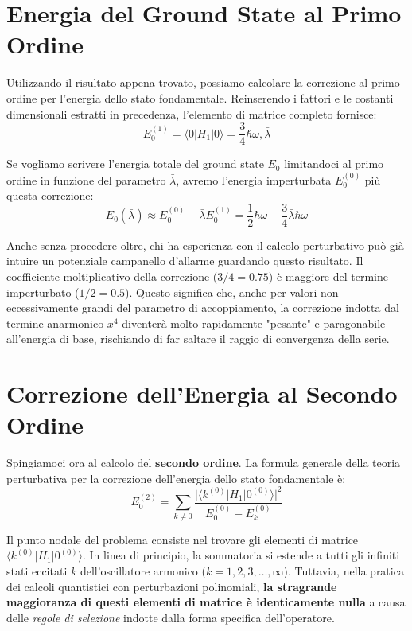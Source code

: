 \section{Energia del Ground State al Primo Ordine}

Utilizzando il risultato appena trovato, possiamo calcolare la correzione al primo ordine per l'energia dello stato fondamentale. Reinserendo i fattori e le costanti dimensionali estratti in precedenza, l'elemento di matrice completo fornisce:
\begin{equation}
E_0^{(1)} = \langle 0 | H_1 | 0 \rangle = \frac{3}{4} \hbar \omega , \bar{\lambda}
\end{equation}

Se vogliamo scrivere l'energia totale del ground state $E_0$ limitandoci al primo ordine in funzione del parametro $\bar{\lambda}$, avremo l'energia imperturbata $E_0^{(0)}$ più questa correzione:
\begin{equation}
E_0(\bar{\lambda}) \approx E_0^{(0)} + \bar{\lambda} E_0^{(1)} = \frac{1}{2} \hbar \omega + \frac{3}{4} \bar{\lambda} \hbar \omega
\end{equation}

Anche senza procedere oltre, chi ha esperienza con il calcolo perturbativo può già intuire un potenziale campanello d'allarme guardando questo risultato. Il coefficiente moltiplicativo della correzione ($3/4 = 0.75$) è maggiore del termine imperturbato ($1/2 = 0.5$). Questo significa che, anche per valori non eccessivamente grandi del parametro di accoppiamento, la correzione indotta dal termine anarmonico $x^4$ diventerà molto rapidamente "pesante" e paragonabile all'energia di base, rischiando di far saltare il raggio di convergenza della serie.

\section{Correzione dell'Energia al Secondo Ordine}

Spingiamoci ora al calcolo del \textbf{secondo ordine}. La formula generale della teoria perturbativa per la correzione dell'energia dello stato fondamentale è:
\begin{equation}
E_0^{(2)} = \sum_{k \neq 0} \frac{\big| \langle k^{(0)} | H_1 | 0^{(0)} \rangle \big|^2}{E_0^{(0)} - E_k^{(0)}}
\end{equation}

Il punto nodale del problema consiste nel trovare gli elementi di matrice $\langle k^{(0)} \vert{} H_1 \vert{} 0^{(0)} \rangle$.
In linea di principio, la sommatoria si estende a tutti gli infiniti stati eccitati $k$ dell'oscillatore armonico ($k=1, 2, 3, \dots, \infty$). Tuttavia, nella pratica dei calcoli quantistici con perturbazioni polinomiali, \textbf{la stragrande maggioranza di questi elementi di matrice è identicamente nulla} a causa delle \textit{regole di selezione} indotte dalla forma specifica dell'operatore.

